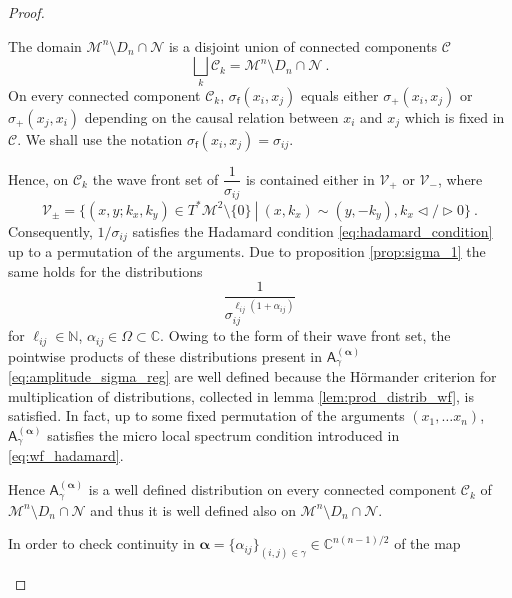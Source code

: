\documentclass[11pt]{book}
\newcommand{\com}[1]{{\color{red}\bf #1}}
\newcommand{\alphabd}{\boldsymbol{\alpha}}
\newcommand{\Ccal}{\mathcal{C}}
\newcommand{\Mcal}{\mathcal{M}}
\newcommand{\Ncal}{\mathcal{N}}
\newcommand{\Vcal}{\mathcal{V}}
\newcommand{\Cbb}{\mathbb{C}}
\newcommand{\Nbb}{\mathbb{N}}
\newcommand{\Asf}{\mathsf{A}}
\newcommand{\fsf}{\mathsf{f}}
\theoremstyle{break}
\begin{document}
\begin{proof}
\begin{description}
\item The domain $\Mcal^n\setminus D_n\cap \Ncal$ is a disjoint union of connected components $\Ccal$
%
\begin{equation*}
\bigsqcup_k \Ccal_k = \Mcal^n\setminus D_n\cap \Ncal \ .
\end{equation*}
%
On every connected component $\Ccal_k$, $\sigma_\fsf(x_i,x_j)$ equals either $\sigma_+(x_i,x_j)$ or $\sigma_+(x_j,x_i)$ depending on the causal relation between $x_i$ and $x_j$ which is fixed in $\Ccal$. We shall use the notation $\sigma_\fsf(x_i,x_j)=\sigma_{ij}$.

%
%
\item[\ref{item:1_amplitude_sigma_prop_analyt}] Hence, on $\Ccal_k$ the wave front set of $\dfrac{1}{\sigma_{ij}}$ is contained either in $\Vcal_+$ or $\Vcal_-$, where
%
\begin{equation*}
\Vcal_\pm = \bigg\{(x,y;k_x,k_y) \in T^\ast\Mcal^2\setminus\{0\} \ \left| \ (x,k_x) \sim (y,-k_y),  k_x \triangleleft / \triangleright 0 \bigg\} \right. \ .
\end{equation*}
%
Consequently, $1/\sigma_{ij}$ satisfies the Hadamard condition \eqref{eq:hadamard_condition} up to a permutation of the arguments. Due to proposition \ref{prop:sigma_1} the same holds for the distributions
%
\begin{equation*}
\frac{1}{\sigma_{ij}^{\ell_{ij}(1+\alpha_{ij})}}
\end{equation*}
%
for $\ell_{ij} \in \Nbb$, $\alpha_{ij}\in\Omega\subset\Cbb$. Owing to the form of their wave front set, the pointwise products of these distributions present in $\Asf_\gamma^{(\alphabd)}$ \eqref{eq:amplitude_sigma_reg} are well defined because the Hörmander criterion for multiplication of distributions, collected in lemma \ref{lem:prod_distrib_wf}, is satisfied. In fact, up to some fixed permutation of the arguments $(x_1,\dots x_n)$, $\Asf_\gamma^{(\alphabd)}$ satisfies the micro local spectrum condition introduced in \ref{eq:wf_hadamard}. \par%
%
Hence $\Asf_\gamma^{(\alphabd)}$ is a well defined distribution on every connected component $\Ccal_k$ of $\Mcal^n\setminus D_n\cap \Ncal$ and thus it is well defined also on $\Mcal^n\setminus D_n\cap \Ncal$. 
%
%
\com{
\item[\ref{item:2_amplitude_sigma_prop_analyt}] In order to check continuity in $\alphabd = \{\alpha_{ij}\}_{(i,j)\in\gamma} \in \Cbb^{n(n-1)/2}$ of the map
}
\end{description}
\end{proof}
\end{document}
